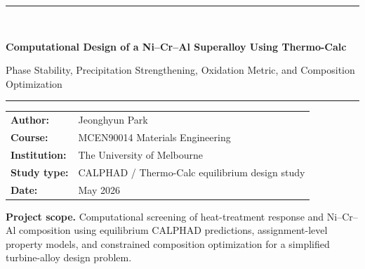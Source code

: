 \documentclass[11pt]{article}
\begin{document}
\begin{titlepage}
\thispagestyle{empty}
\vspace*{1.15in}
{\color{navy}\rule{\textwidth}{1.2pt}}\\[0.35in]
{\Huge\bfseries Computational Design of a Ni--Cr--Al Superalloy Using Thermo-Calc\par}
\vspace{0.22in}
{\Large Phase Stability, Precipitation Strengthening, Oxidation Metric, and Composition Optimization\par}
\vspace{0.38in}
{\color{navy}\rule{\textwidth}{0.7pt}}

\vfill
\begin{tabular}{@{}ll@{}}
\textbf{Author:} & Jeonghyun Park \\
\textbf{Course:} & MCEN90014 Materials Engineering \\
\textbf{Institution:} & The University of Melbourne \\
\textbf{Study type:} & CALPHAD / Thermo-Calc equilibrium design study \\
\textbf{Date:} & May 2026 \\
\end{tabular}
\vfill

\begin{minipage}{0.92\textwidth}
\small
\textbf{Project scope.} Computational screening of heat-treatment response and Ni--Cr--Al composition using equilibrium CALPHAD predictions, assignment-level property models, and constrained composition optimization for a simplified turbine-alloy design problem.
\end{minipage}
\end{titlepage}
\end{document}
